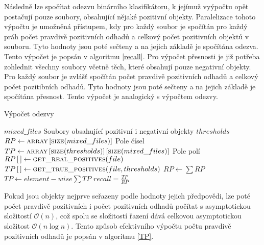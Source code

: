 Následně lze spočítat odezvu binárního klasifikátoru, k jejímuž vyýpočtu opět postačují pouze soubory, obsahující nějaké pozitivní objekty. Paralelizace tohoto výpočtu je umožněná	přístupem, kdy pro každý soubor je spočítán pro každý práh počet pravdivě pozitivních odhadů a celkový počet pozitivních objektů v souboru. Tyto hodnoty jsou poté sečteny a na jejich základě je spočítána odezva. Tento výpočet je popsán v algoritmu \ref{recall}. Pro výpočet přesnosti je již potřeba zohlednit všechny soubory včetně těch, které obsahují pouze negativní objekty. Pro každý soubor je zvlášť spočítán počet pravdivě pozitivních odhadů a celkový počet pozitibních odhadů. Tyto hodnoty jsou poté sečteny a na jejich základě je spočítána přesnost. Tento výpočet je analogický s výpočtem odezvy.

\begin{algorithm}
	\caption{Výpočet odezvy}
	\label{recall}
	\begin{algorithmic}
		\Require $ mixed\_files $ \Comment Soubory obsahující pozitivní i negativní objekty
		\Require $ thresholds $
		\Statex
		\State $ RP \gets \Call{array}{} \left[ \Call{size}{mixed\_files} \right] $ \Comment Pole čísel
		\State $ TP \gets \Call{array}{} \left[ \Call{size}{thresholds} \right] \left[ \Call{size}{mixed\_files} \right] $ \Comment Pole polí
			\State $ RP \left[ \, \right] \gets \Call{get\_real\_positives}{file} $
			\State $ TP \left[ \, \right] \gets \Call{get\_true\_positives}{file, thresholds} $
		\EndFor
		\State $ RP \gets \sum RP $
		\State $ TP \gets element-wise \sum TP $
		\State $ recall = \frac{TP}{RP} $
	\end{algorithmic}
\end{algorithm}

Pokud jsou objekty nejprve seřazeny podle hodnoty jejich předpovědi, lze poté počet pravdivě pozitivních i počet pozitivních odhadů počítat s asymptotickou složitostí \( \mathcal O \left( n \right) \), což spolu se složitostí řazení dává celkovou asymptotickou složitost \( \mathcal O \left( n \log n \right) \). Tento způsob efektivního výpočtu počtu pravdivě pozitivních odhadů je popsán v algoritmu \ref{TP}.


